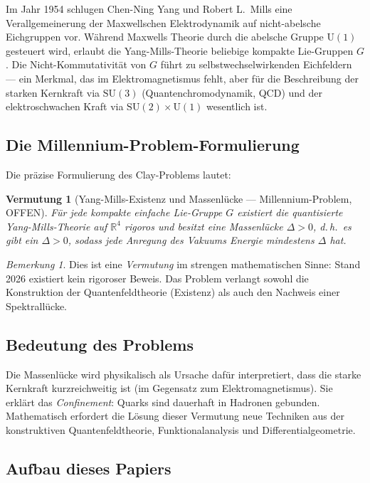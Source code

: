 \documentclass[12pt,a4paper]{amsart}
\newtheorem{conjecture}{Vermutung}
\theoremstyle{definition}
\theoremstyle{remark}
\newtheorem{remark}[theorem]{Bemerkung}
\begin{document}
Im Jahr 1954 schlugen Chen-Ning Yang und Robert L.\ Mills \cite{YangMills1954} eine
Verallgemeinerung der Maxwellschen Elektrodynamik auf nicht-abelsche Eichgruppen vor.
Während Maxwells Theorie durch die abelsche Gruppe $\mathrm{U}(1)$ gesteuert wird,
erlaubt die Yang-Mills-Theorie beliebige kompakte Lie-Gruppen $G$. Die Nicht-Kommutativität
von $G$ führt zu selbstwechselwirkenden Eichfeldern — ein Merkmal, das im
Elektromagnetismus fehlt, aber für die Beschreibung der starken Kernkraft via
$\mathrm{SU}(3)$ (Quantenchromodynamik, QCD) und der elektroschwachen Kraft via
$\mathrm{SU}(2) \times \mathrm{U}(1)$ wesentlich ist.

\subsection{Die Millennium-Problem-Formulierung}

Die präzise Formulierung des Clay-Problems \cite{JaffeWitten2000} lautet:

\begin{conjecture}[Yang-Mills-Existenz und Massenlücke — Millennium-Problem, OFFEN]
\label{verm:massluecke}
Für jede kompakte einfache Lie-Gruppe $G$ existiert die quantisierte Yang-Mills-Theorie
auf $\mathbb{R}^4$ rigoros und besitzt eine Massenlücke $\Delta > 0$, d.\,h.\ es gibt
ein $\Delta > 0$, sodass jede Anregung des Vakuums Energie mindestens $\Delta$ hat.
\end{conjecture}

\begin{remark}
Dies ist eine \emph{Vermutung} im strengen mathematischen Sinne: Stand 2026 existiert
kein rigoroser Beweis. Das Problem verlangt sowohl die Konstruktion der Quantenfeldtheorie
(Existenz) als auch den Nachweis einer Spektrallücke.
\end{remark}

\subsection{Bedeutung des Problems}

Die Massenlücke wird physikalisch als Ursache dafür interpretiert, dass die starke
Kernkraft kurzreichweitig ist (im Gegensatz zum Elektromagnetismus). Sie erklärt das
\emph{Confinement}: Quarks sind dauerhaft in Hadronen gebunden. Mathematisch erfordert
die Lösung dieser Vermutung neue Techniken aus der konstruktiven Quantenfeldtheorie,
Funktionalanalysis und Differentialgeometrie.

\subsection{Aufbau dieses Papiers}
\end{document}

